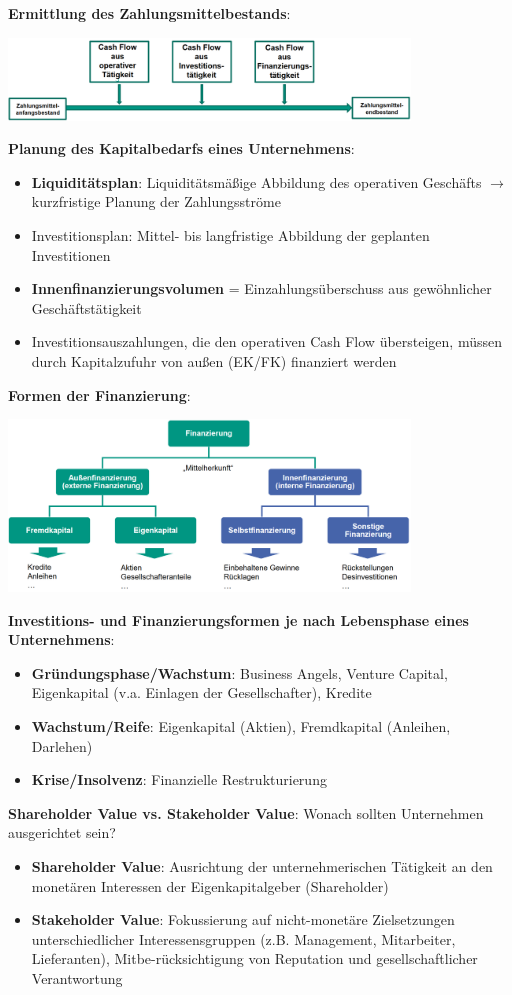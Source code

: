 \pagebreak
\textbf{Ermittlung des Zahlungsmittelbestands}:
\begin{center}
	\includegraphics[width=0.8\textwidth]{images/zbestand.png}
\end{center}
\bigskip
\textbf{Planung des Kapitalbedarfs eines Unternehmens}:
\begin{itemize}
	\item \textbf{Liquiditätsplan}: Liquiditätsmäßige Abbildung des operativen Geschäfts $\rightarrow$ kurzfristige Planung der Zahlungsströme
	\item Investitionsplan: Mittel- bis langfristige Abbildung der geplanten Investitionen 
	\item \textbf{Innenfinanzierungsvolumen} = Einzahlungsüberschuss aus gewöhnlicher Geschäftstätigkeit
	\item  Investitionsauszahlungen, die den operativen Cash Flow übersteigen, müssen durch Kapitalzufuhr von außen (EK/FK) finanziert werden
\end{itemize}
\bigskip
\textbf{Formen der Finanzierung}:
\begin{center}
	\includegraphics[width=0.8\textwidth]{images/finanzierung.png}
\end{center}
\textbf{Investitions- und Finanzierungsformen je nach Lebensphase eines Unternehmens}:
\begin{itemize}
	\item \textbf{Gründungsphase/Wachstum}: Business Angels, Venture Capital, Eigenkapital (v.a. Einlagen der Gesellschafter), Kredite
	\item \textbf{Wachstum/Reife}: Eigenkapital (Aktien), Fremdkapital (Anleihen, Darlehen)
	\item \textbf{Krise/Insolvenz}: Finanzielle Restrukturierung
\end{itemize}
\bigskip
\textbf{Shareholder Value vs. Stakeholder Value}: Wonach sollten Unternehmen ausgerichtet sein?
\begin{itemize}
	\item \textbf{Shareholder Value}: Ausrichtung der unternehmerischen Tätigkeit an den monetären Interessen der Eigenkapitalgeber (Shareholder)
	\item \textbf{Stakeholder Value}: Fokussierung auf nicht-monetäre Zielsetzungen unterschiedlicher Interessensgruppen (z.B. Management, Mitarbeiter, Lieferanten), Mitbe-rücksichtigung von Reputation und gesellschaftlicher Verantwortung
\end{itemize}